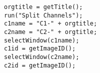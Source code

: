 \begin{lstlisting}
orgtitle = getTitle();
run("Split Channels");
c1name = "C1-" + orgtitle;
c2name = "C2-" + orgtitle;
selectWindow(c1name);
c1id = getImageID();
selectWindow(c2name);
c2id = getImageID();

\end{lstlisting}